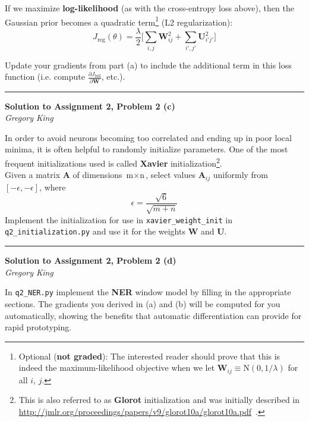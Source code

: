 \documentclass[letter,12pt]{article}
\newcommand{\myhwtitle}[3]
{\begin{center}
{\large {\bf Solution to Assignment {#1}, Problem {#2}}}\\
\medskip 
{\it {#3}} %
\end{center}}
\begin{document}
\noindent If we maximize \textbf{log-likelihood} (as with the cross-entropy loss above), then the Gaussian prior becomes a quadratic term\footnote{Optional (\textbf{not graded}): The interested reader should prove that this is indeed the maximum-likelihood objective when we let ${\boldsymbol W}_{ij} \equiv \textrm{N}(0, 1/\lambda)$ for all $i$, $j$.} (L2 regularization):
\begin{equation}
J_{\textrm{reg}}(\theta) = \frac{\lambda}{2}\big[\sum_{i,j}{\boldsymbol W}^{2}_{ij} + \sum_{i\prime,j\prime}{\boldsymbol U}^{2}_{i\prime j\prime} \big]
\end{equation}

\noindent Update your gradients from part (a) to include the additional term in this loss function (i.e. compute $\frac{\partial J_{\textrm{full}}}{\partial{\boldsymbol W}}$, etc.).\vspace{5mm}

\noindent\rule{\textwidth}{0.4pt}

\clearpage

\myhwtitle{2}{2 (c)}{Gregory King}

\bigskip

\noindent In order to avoid neurons becoming too correlated and ending up in poor local minima, it is often helpful to randomly initialize parameters. One of the most frequent initializations used is called \textbf{Xavier} initialization\footnote{This is also referred to as \textbf{Glorot} initialization and was initially described in \url{http://jmlr.org/proceedings/papers/v9/glorot10a/glorot10a.pdf}~.}.\\

\noindent Given a matrix ${\boldsymbol A}$ of dimensions $\textrm{m}\times\textrm{n}$, select values ${\boldsymbol A}_{ij}$ uniformly from $[-\epsilon,-\epsilon]$, where\\
\begin{equation}
\epsilon = \frac{\sqrt{6}}{\sqrt{m+n}}
\end{equation}
Implement the initialization for use in \texttt{xavier\_weight\_init} in \texttt{q2\_initialization.py} and use it for the weights ${\boldsymbol W}$ and ${\boldsymbol U}$.

\vspace{5mm}
\noindent\rule{\textwidth}{0.4pt}

\clearpage

\myhwtitle{2}{2 (d)}{Gregory King}

\bigskip

\noindent In \texttt{q2\_NER.py} implement the \textbf{NER} window model by filling in the appropriate sections. The gradients you derived in (a) and (b) will be computed for you automatically, showing the benefits that automatic differentiation can provide for rapid prototyping.\\
\end{document}
